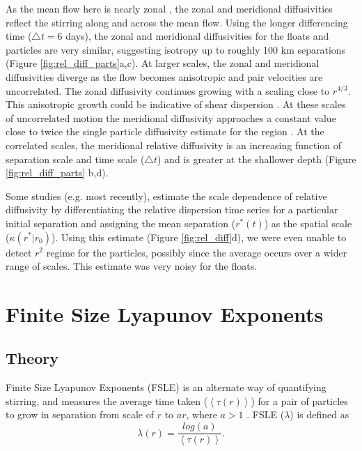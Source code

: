\documentclass[]{ametsoc}
\begin{document}
As the mean flow here is nearly zonal \citep{lacasce2014,balwada2016b}, the zonal and meridional diffusivities reflect the stirring along and across the mean flow. Using the longer differencing time ($\triangle t=6$ days), the zonal and meridional diffusivities for the floats and particles are very similar, suggesting isotropy up to roughly 100 km separations (Figure \ref{fig:rel_diff_parts}a,c). At larger scales, the zonal and meridional diffusivities diverge as the flow becomes anisotropic and pair velocities are uncorrelated. The zonal diffusivity continues growing with a scaling close to $r^{4/3}$. This anisotropic growth could be indicative of shear dispersion \citep{bennett1984relative,lacasce2008statistics}. At these scales of uncorrelated motion the meridional diffusivity approaches a constant value close to twice the single particle diffusivity estimate for the region \citep{lacasce2014, balwada2016}. At the correlated scales, the meridional relative diffusivity is an increasing function of separation scale and time scale ($\triangle t$) and is greater at the shallower depth (Figure \ref{fig:rel_diff_parts} b,d).

Some studies (e.g. \cite{sinha2019modulation, sanson2015surface} most recently), estimate the scale dependence of relative diffusivity by differentiating the relative dispersion time series for a particular initial separation and assigning the mean separation ($r^*(t)$) as the spatial scale ($\kappa(r^*|r_0)$). Using this estimate (Figure \ref{fig:rel_diff}d), we were even unable to detect $r^2$ regime for the particles, possibly since the average occurs over a wider range of scales. This estimate was very noisy for the floats. 

\section{Finite Size Lyapunov Exponents} 
\subsection{Theory}
Finite Size Lyapunov Exponents (FSLE) is an alternate way of quantifying stirring, and measures the average time taken ($\left<\tau (r) \right>$) for a pair of particles to grow in separation from scale of $r$ to $ar$, where $a>1$ \citep{artale1997dispersion}. FSLE ($\lambda$) is defined as
\begin{equation}
\lambda(r) = \frac{log(a)}{\left< \tau(r) \right>}.
\end{equation}
\end{document}
